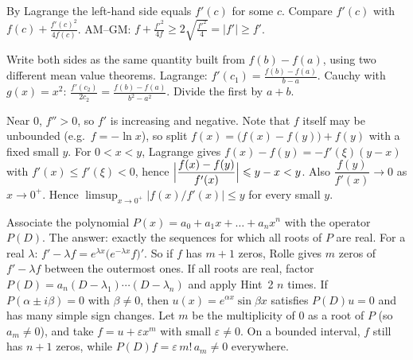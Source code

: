 \documentclass[11pt,a4paper]{article}
\begin{document}
 By Lagrange the left-hand side equals $f'(c)$ for some $c$. Compare $f'(c)$ with $f(c)+\frac{f'(c)^2}{4f(c)}$.
 AM--GM: $f+\frac{f'^2}{4f}\ge2\sqrt{\frac{f'^2}{4}}=|f'|\ge f'$.

 Write both sides as the same quantity built from $f(b)-f(a)$, using two different mean value theorems.
 Lagrange: $f'(c_1)=\frac{f(b)-f(a)}{b-a}$. Cauchy with $g(x)=x^2$: $\frac{f'(c_2)}{2c_2}=\frac{f(b)-f(a)}{b^2-a^2}$. Divide the first by $a+b$.

 Near $0$, $f''>0$, so $f'$ is increasing and negative. Note that $f$ itself may be unbounded (e.g.\ $f=-\ln x$), so split $f(x)=\bigl(f(x)-f(y)\bigr)+f(y)$ with a fixed small $y$.
 For $0<x<y$, Lagrange gives $f(x)-f(y)=-f'(\xi)(y-x)$ with $f'(x)\le f'(\xi)<0$, hence $\Bigl|\dfrac{f(x)-f(y)}{f'(x)}\Bigr|\le y-x<y$.
 Also $\dfrac{f(y)}{f'(x)}\to0$ as $x\to0^+$. Hence $\limsup_{x\to0^+}\bigl|f(x)/f'(x)\bigr|\le y$ for every small $y$.

 Associate the polynomial $P(x)=a_0+a_1x+\dots+a_nx^n$ with the operator $P(D)$. The answer: exactly the sequences for which all roots of $P$ are real.
 For a real $\lambda$: $f'-\lambda f=e^{\lambda x}\bigl(e^{-\lambda x}f\bigr)'$. So if $f$ has $m+1$ zeros, Rolle gives $m$ zeros of $f'-\lambda f$ between the outermost ones.
 If all roots are real, factor $P(D)=a_n(D-\lambda_1)\cdots(D-\lambda_n)$ and apply Hint~2 $n$ times.
 If $P(\alpha\pm i\beta)=0$ with $\beta\ne0$, then $u(x)=e^{\alpha x}\sin\beta x$ satisfies $P(D)u=0$ and has many simple sign changes. Let $m$ be the multiplicity of $0$ as a root of $P$ (so $a_m\ne0$), and take $f=u+\varepsilon x^m$ with small $\varepsilon\ne0$. On a bounded interval, $f$ still has $n+1$ zeros, while $P(D)f=\varepsilon\,m!\,a_m\ne0$ everywhere.
\end{document}
